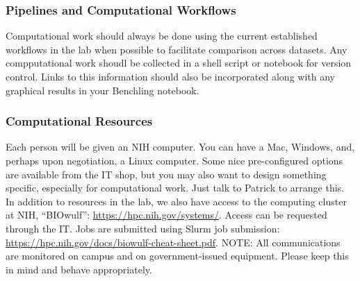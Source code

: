 \documentclass[10pt, letterpaper, twocolumn]{article} %
\begin{document}
\subsubsection{Pipelines and Computational Workflows}
Computational work should always be done using the current established workflows in the lab when possible to facilitate comparison across datasets. Any compputational work shoudl be collected in a shell script or notebook for version control. Links to this information should also be incorporated along with any graphical results in your Benchling notebook.

\subsubsection{Computational Resources}
Each person will be given an NIH computer. You can have a Mac, Windows, and, perhaps upon negotiation, a Linux computer. Some nice pre-configured options are available from the IT shop, but you may also want to design something specific, especially for computational work. Just talk to Patrick to arrange this.
In addition to resources in the lab, we also have access to the computing cluster at NIH, “BIOwulf”: \href{https://hpc.nih.gov/systems/}{https://hpc.nih.gov/systems/}. Access can be requested through the IT. Jobs are submitted using Slurm job submission: \href{https://hpc.nih.gov/docs/biowulf-cheat-sheet.pdf}{https://hpc.nih.gov/docs/biowulf-cheat-sheet.pdf}.
\newline
NOTE: All communications are monitored on campus and on government-issued equipment. Please keep this in mind and behave appropriately.
\end{document}
